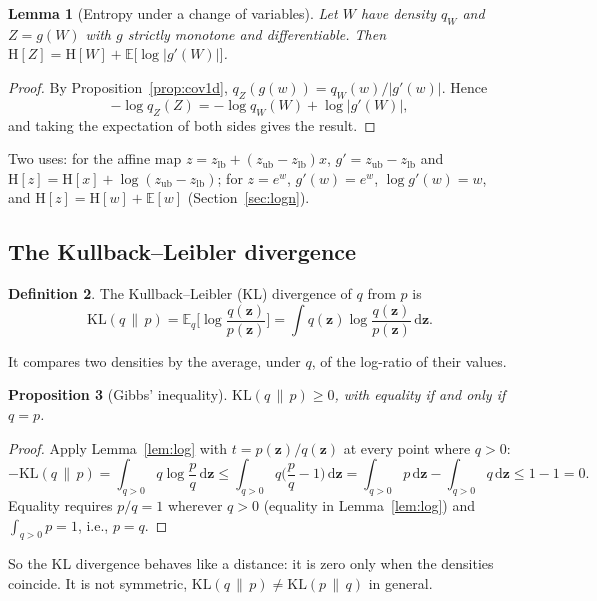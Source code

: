 \documentclass[11pt,a4paper]{article}
\numberwithin{equation}{section}
\theoremstyle{plain}
\newtheorem{proposition}{Proposition}[section]
\newtheorem{lemma}[proposition]{Lemma}
\theoremstyle{definition}
\newtheorem{definition}[proposition]{Definition}
\theoremstyle{remark}
\newcommand{\z}{\mathbf{z}}
\newcommand{\E}{\mathbb{E}}
\newcommand{\KL}{\mathrm{KL}}
\newcommand{\Hent}{\mathrm{H}}
\newcommand{\dd}{\,\mathrm{d}}
\newcommand{\zlb}{z_{\text{lb}}}
\newcommand{\zub}{z_{\text{ub}}}
\begin{document}
\begin{lemma}[Entropy under a change of variables]
\label{lem:entropy_cov}
Let $W$ have density $q_W$ and $Z=g(W)$ with $g$ strictly monotone and differentiable. Then $\Hent[Z]=\Hent[W]+\E\big[\log|g'(W)|\big]$.
\end{lemma}
\begin{proof}
By Proposition~\ref{prop:cov1d}, $q_Z(g(w))=q_W(w)/|g'(w)|$. Hence
\begin{equation*}
-\log q_Z(Z)=-\log q_W(W)+\log|g'(W)|,
\end{equation*}
and taking the expectation of both sides gives the result.
\end{proof}
Two uses: for the affine map $z=\zlb+(\zub-\zlb)x$, $g'=\zub-\zlb$ and $\Hent[z]=\Hent[x]+\log(\zub-\zlb)$; for $z=e^w$, $g'(w)=e^w$, $\log g'(w)=w$, and $\Hent[z]=\Hent[w]+\E[w]$ (Section~\ref{sec:logn}).

\subsection{The Kullback--Leibler divergence}
\begin{definition}
The Kullback--Leibler (KL) divergence of $q$ from $p$ is \cite{kullback1951,cover2006}
\begin{equation}
\KL(q\,\|\,p)=\E_q\Big[\log\frac{q(\z)}{p(\z)}\Big]=\int q(\z)\log\frac{q(\z)}{p(\z)}\dd\z.
\end{equation}
\end{definition}
It compares two densities by the average, under $q$, of the log-ratio of their values.

\begin{proposition}[Gibbs' inequality]
\label{prop:gibbs}
$\KL(q\,\|\,p)\ge0$, with equality if and only if $q=p$.
\end{proposition}
\begin{proof}
Apply Lemma~\ref{lem:log} with $t=p(\z)/q(\z)$ at every point where $q>0$:
\begin{equation*}
-\KL(q\,\|\,p)=\int_{q>0}q\log\frac pq\dd\z\le\int_{q>0}q\Big(\frac pq-1\Big)\dd\z=\int_{q>0}p\dd\z-\int_{q>0}q\dd\z\le1-1=0.
\end{equation*}
Equality requires $p/q=1$ wherever $q>0$ (equality in Lemma~\ref{lem:log}) and $\int_{q>0}p=1$, i.e., $p=q$.
\end{proof}
So the KL divergence behaves like a distance: it is zero only when the densities coincide. It is not symmetric, $\KL(q\,\|\,p)\neq\KL(p\,\|\,q)$ in general.
\end{document}
